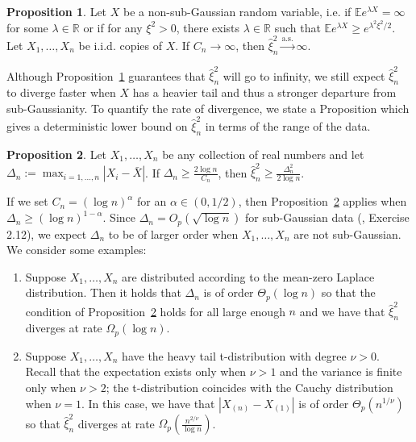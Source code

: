 \documentclass{article}
\theoremstyle{definition}
\newtheorem{proposition}{Proposition}
\newcommand{\1}{\mathbbm{1}}
\begin{document}
\begin{proposition}
\label{prop:divergence}
Let $X$ be a non-sub-Gaussian random variable, i.e. if $\mathbb{E} e^{\lambda X} = \infty$ for some $\lambda \in \mathbb{R}$ or if for any $\xi^2 > 0$, there exists $\lambda \in \mathbb{R}$ such that $\mathbb{E} e^{\lambda X} \geq e^{ \lambda^2 \xi^2 / 2}$. Let $X_1, \ldots, X_n$ be i.i.d. copies of $X$. If $C_n \rightarrow \infty$, then $\hat{\xi}^2_n \xrightarrow{\mathrm{a.s.}} \infty$. 
\end{proposition}

Although Proposition~\ref{prop:divergence} guarantees that $\hat{\xi}_n^2$ will go to infinity, we still expect $\hat{\xi}^2_n$ to diverge faster when $X$ has a heavier tail and thus a stronger departure from sub-Gaussianity. To quantify the rate of divergence, we state a Proposition which gives a deterministic lower bound on $\hat{\xi}_n^2$ in terms of the range of the data. 

\begin{proposition}
\label{prop:divergence2}
Let $X_1, \ldots, X_n$ be any collection of real numbers and let $\Delta_n := \max_{i = 1, \ldots, n} | X_i - \bar{X}|$. If $\Delta_n \geq \frac{2\log n}{C_n}$, then $\hat{\xi}^2_n \geq \frac{\Delta_n^2}{2 \log n}$. 
\end{proposition}

If we set $C_n = (\log n)^\alpha$ for an $\alpha \in (0, 1/2)$, then Proposition~\ref{prop:divergence2} applies when $\Delta_n \geq (\log n)^{1- \alpha}$. Since $\Delta_n = O_p(\sqrt{ \log n})$ for sub-Gaussian data (\cite{Wainwright_2019}, Exercise 2.12), we expect $\Delta_n$ to be of larger order when $X_1, \ldots, X_n$ are not sub-Gaussian. We consider some examples:
\begin{enumerate}[leftmargin=3mm]
\item Suppose $X_1, \ldots, X_n$ are distributed according to the mean-zero Laplace distribution. Then it holds that $\Delta_n$ is of order $\Theta_p(\log n)$ so that the condition of Proposition~\ref{prop:divergence2} holds for all large enough $n$ and we have that $\hat{\xi}^2_n$ diverges at rate $\Omega_p(\log n)$. 
\item Suppose $X_1, \ldots, X_n$ have the heavy tail t-distribution with degree $\nu > 0$. Recall that the expectation exists only when $\nu > 1$ and the variance is finite only when $\nu > 2$; the t-distribution coincides with the Cauchy distribution when $\nu = 1$. In this case, we have that $|X_{(n)} - X_{(1)}|$ is of order $\Theta_p( n^{1/\nu} )$ so that $\hat{\xi}^2_n$ diverges at rate $\Omega_p( \frac{n^{2/\nu} }{\log n})$. 
\end{enumerate}
\end{document}
